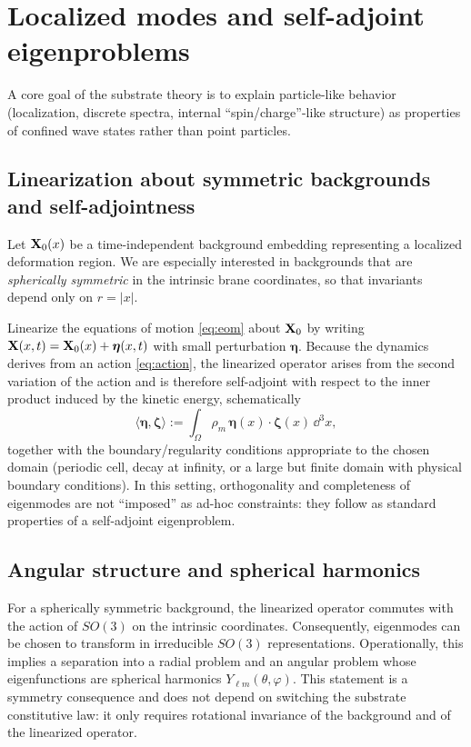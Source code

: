 \section{Localized modes and self-adjoint eigenproblems}
\label{sec:localized}

A core goal of the substrate theory is to explain particle-like behavior (localization, discrete spectra,
internal ``spin/charge''-like structure) as properties of confined wave states rather than point particles.

\subsection{Linearization about symmetric backgrounds and self-adjointness}

Let $\mathbf{X}_0(x)$ be a time-independent background embedding representing a localized deformation region.
We are especially interested in backgrounds that are \emph{spherically symmetric} in the intrinsic brane coordinates,
so that invariants depend only on $r=|x|$.

Linearize the equations of motion \eqref{eq:eom} about $\mathbf{X}_0$ by writing
$\mathbf{X}(x,t)=\mathbf{X}_0(x)+\bm{\eta}(x,t)$ with small perturbation $\bm{\eta}$.
Because the dynamics derives from an action \eqref{eq:action}, the linearized operator arises from the second
variation of the action and is therefore self-adjoint with respect to the inner product induced by the kinetic energy,
schematically
\begin{equation}
  \langle \bm{\eta},\bm{\zeta}\rangle
  :=\int_{\Omega} \rho_m\,\bm{\eta}(x)\cdot \bm{\zeta}(x)\,\dd^3x,
  \label{eq:inner-product}
\end{equation}
together with the boundary/regularity conditions appropriate to the chosen domain (periodic cell, decay at infinity,
or a large but finite domain with physical boundary conditions).
In this setting, orthogonality and completeness of eigenmodes are not ``imposed'' as ad-hoc constraints: they follow as
standard properties of a self-adjoint eigenproblem.

\subsection{Angular structure and spherical harmonics}

For a spherically symmetric background, the linearized operator commutes with the action of $SO(3)$ on the intrinsic
coordinates. Consequently, eigenmodes can be chosen to transform in irreducible $SO(3)$ representations.
Operationally, this implies a separation into a radial problem and an angular problem whose eigenfunctions are
spherical harmonics $Y_{\ell m}(\theta,\varphi)$.
This statement is a symmetry consequence and does not depend on switching the substrate constitutive law:
it only requires rotational invariance of the background and of the linearized operator.

